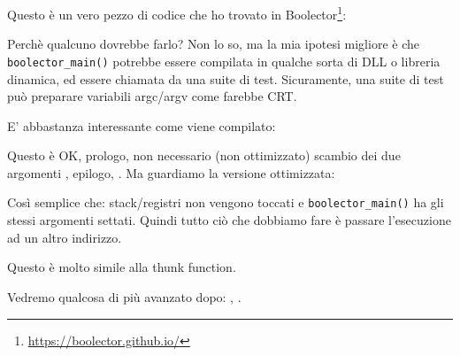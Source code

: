 \label{Boolector}

Questo è un vero pezzo di codice che ho trovato in  Boolector\footnote{\url{https://boolector.github.io/}}:



Perchè qualcuno dovrebbe farlo?
Non lo so, ma la mia ipotesi migliore è che \verb|boolector_main()| potrebbe essere compilata in qualche sorta di DLL o libreria dinamica,
ed essere chiamata da una suite di test.
Sicuramente, una suite di test può preparare variabili argc/argv come farebbe \ac{CRT}.

E' abbastanza interessante come viene compilato:



Questo è OK, prologo, non necessario (non ottimizzato) scambio dei due argomenti , epilogo, .
Ma guardiamo la versione ottimizzata:



Così semplice che: stack/registri non vengono toccati e \verb|boolector_main()| ha gli stessi argomenti settati.
Quindi tutto ciò che dobbiamo fare è passare l'esecuzione ad un altro indirizzo.

Questo è molto simile alla \gls{thunk function}.

Vedremo qualcosa di più avanzato dopo: , .

